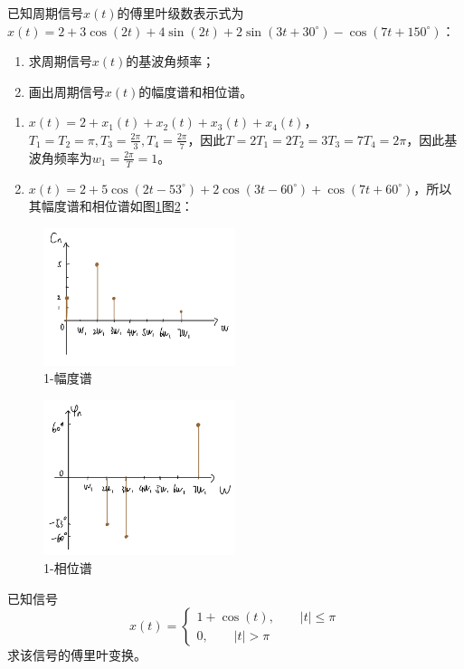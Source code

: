 \documentclass[answers]{exam}  %
\begin{document}
\Large


\begin{questions}
	
\question 已知周期信号$x(t)$的傅里叶级数表示式为$x(t) = 2 + 3\cos(2t) + 4\sin(2t) + 2\sin(3t + 30^{\circ}) - \cos(7t + 150^{\circ})$：

\begin{enumerate}[(1)]
	\item 求周期信号$x(t)$的基波角频率；
	\item 画出周期信号$x(t)$的幅度谱和相位谱。
\end{enumerate}

\begin{solution}
	\begin{enumerate}[(1)]
		\item $x(t)=2+x_1(t)+x_2(t)+x_3(t)+x_4(t)$，$T_1=T_2=\pi,T_3=\frac{2\pi}{3},T_4=\frac{2\pi}{7}$，因此$T=2T_1=2T_2=3T_3=7T_4=2\pi$，因此基波角频率为$w_1=\frac{2\pi}{T}=1$。
		\item $x(t)=2+5\cos(2t-53^{\circ})+2\cos(3t-60^{\circ})+\cos(7t+60^{\circ})$，所以其幅度谱和相位谱如图\ref{fig:1}图\ref{fig:2}：
	\end{enumerate}
\end{solution}
\begin{figure}
	\centering
	\includegraphics[width=0.5\textwidth]{pics/1-1.png}
	\caption{1-幅度谱}
	\label{fig:1}
\end{figure}
\begin{figure}
	\centering
	\includegraphics[width=0.5\textwidth]{pics/1-2.png}
	\caption{1-相位谱}
	\label{fig:2}
\end{figure}
\question 已知信号
\begin{equation}
	\nonumber
	x(t) = 
	\begin{cases}
		1 + \cos(t), \qquad |t| \leq \pi \\
		0, \qquad |t| > \pi
	\end{cases}	
\end{equation}
求该信号的傅里叶变换。


\end{questions}
\end{document}
